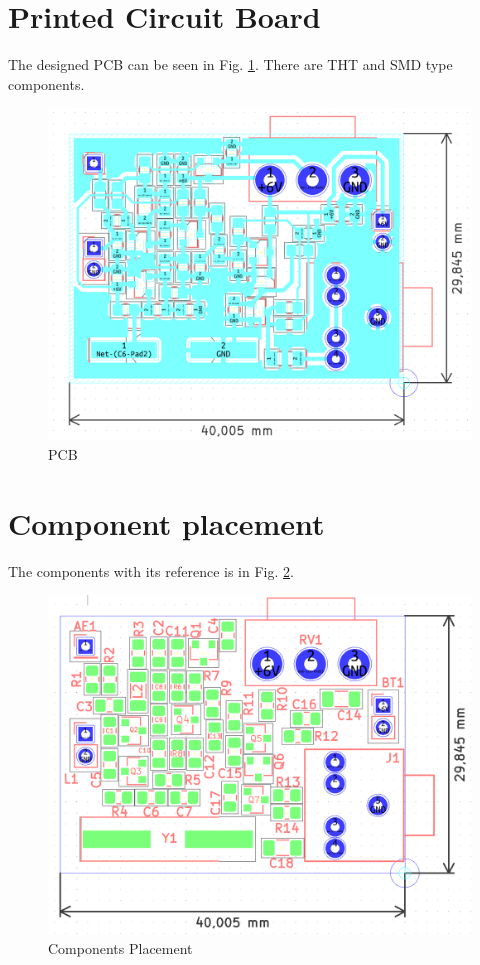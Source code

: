\newpage
\section{Printed Circuit Board}

The designed PCB can be seen in Fig. \ref{fig:rokanyhl}. There are THT and SMD type components.

\begin{figure}[H]
\centering
\includegraphics[width=1\textwidth]{../pic/pcb.png}
\caption{PCB}
\label{fig:rokanyhl}
\end{figure}

\newpage
\section{Component placement}

The components with its reference is in Fig. \ref{fig:rokault}.

\begin{figure}[H]
\centering
\includegraphics[width=1\textwidth]{../pic/pos.png}
\caption{Components Placement}
\label{fig:rokault}
\end{figure}


